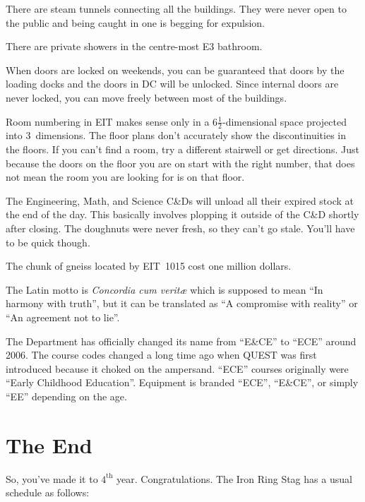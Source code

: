 \documentclass{book}
\begin{document}
There are steam tunnels connecting all the buildings. They were never open to the public and being caught in one is begging for expulsion.

There are private showers in the centre-most E3 bathroom.

When doors are locked on weekends, you can be guaranteed that doors by the loading docks and the doors in DC will be unlocked. Since internal doors are never locked, you can move freely between most of the buildings.

Room numbering in EIT makes sense only in a $6\frac{1}{2}$-dimensional space projected into 3~dimensions. The floor plans don't accurately show the discontinuities in the floors. If you can't find a room, try a different stairwell or get directions. Just because the doors on the floor you are on start with the right number, that does not mean the room you are looking for is on that floor.

The Engineering, Math, and Science C\&Ds will unload all their expired stock at the end of the day. This basically involves plopping it outside of the C\&D shortly after closing. The doughnuts were never fresh, so they can't go stale. You'll have to be quick though.

The chunk of gneiss located by EIT~1015 cost one million dollars.

The Latin motto is \textsl{Concordia cum verit\ae} which is supposed to mean ``In harmony with truth'', but it can be translated as ``A compromise with reality'' or ``An agreement not to lie''.

The Department has officially changed its name from ``E\&CE'' to ``ECE'' around 2006. The course codes changed a long time ago when QUEST was first introduced because it choked on the ampersand. ``ECE'' courses originally were ``Early Childhood Education''. Equipment is branded ``ECE'', ``E\&CE'', or simply ``EE'' depending on the age.

\chapter{The End}
So, you've made it to $4^{\mathrm{th}}$ year. Congratulations. The Iron Ring Stag has a usual schedule as follows:
\end{document}
